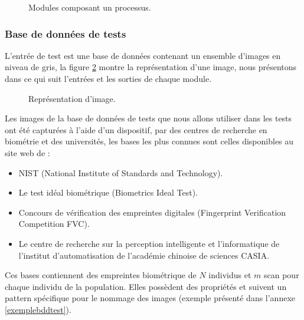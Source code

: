 \begin{figure}[H]
	\centering
	\caption{Modules composant un processus.}
	\label{process}
\end{figure}
\subsubsection{Base de données de tests }
L'entrée de test est une base de données contenant un ensemble d'images en niveau de gris, la figure \ref{imagenum} montre la représentation d'une image, nous présentons dans ce qui suit l'entrées et les sorties de chaque module.
\begin{figure}[H]
	\centering
	\caption{Représentation d’image.}
	\label{imagenum}
\end{figure}
Les images de la base de données de tests que nous allons utiliser dans les tests ont été capturées à l'aide d'un dispositif, par des centres de recherche en biométrie et des universités, les bases les plus connues sont celles disponibles au site web de : 
\begin{itemize}
	\item NIST (National Institute of Standards and Technology).
	\item Le test idéal biométrique (Biometrics Ideal Test).
	\item Concours de vérification des empreintes digitales (Fingerprint Verification Competition FVC).
	\item Le centre de recherche sur la perception intelligente et l'informatique de l’institut d'automatisation de l’académie chinoise de sciences CASIA.
\end{itemize}
Ces bases contiennent des empreintes biométrique de $N$ individus et $m$ scan pour chaque individu de la population. Elles possèdent des propriétés et suivent un pattern spécifique pour le nommage des images (exemple présenté dans l'annexe \ref{exemplebddtest}). 

